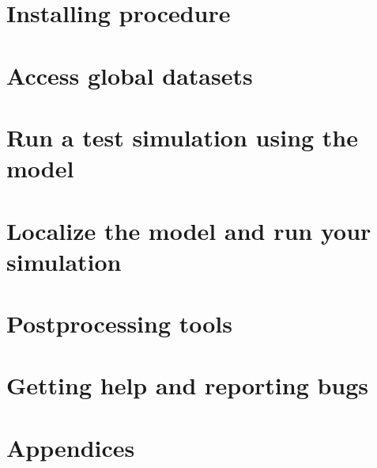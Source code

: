 \documentclass[10pt,twoside,a4paper]{report}
\begin{document}
\chapter{Installing procedure}
\label{install}

\newpage

\chapter{Access global datasets}
\label{obdata}

\newpage

\chapter{Run a test simulation using the model}
\label{tutorial}

\newpage

\chapter{Localize the model and run your simulation}
\label{advanced}

\newpage

\chapter{Postprocessing tools}
\label{postproc}

\newpage

\chapter{Getting help and reporting bugs}
\label{tracker}

\newpage

\cleardoublepage

\chapter{Appendices}
\label{Appendice}


\newpage




\cleardoublepage

\evensidemargin=1.0cm
\oddsidemargin=1.5cm
\end{document}
